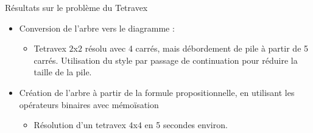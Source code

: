 \documentclass{beamer}
\begin{document}
\begin{frame}{Résultats sur le problème du Tetravex}
\begin{itemize}
\item Conversion de l'arbre vers le diagramme : 
\begin{itemize}
\item Tetravex $2$x$2$ résolu avec 4 carrés, mais débordement de pile à partir de 5 carrés. Utilisation du style par passage de continuation pour réduire la taille de la pile.
\end{itemize}
\item Création de l'arbre à partir de la formule propositionnelle, en utilisant les opérateurs binaires avec mémoïsation
\begin{itemize}
\item Résolution d'un tetravex $4$x$4$ en 5 secondes environ.
\end{itemize}
\end{itemize}
\end{frame}
	
\end{document}
